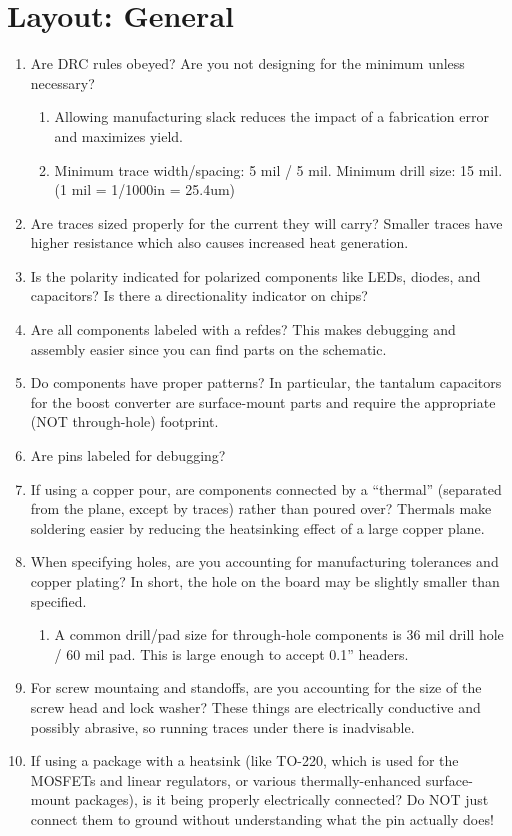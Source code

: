 \documentclass{article}
\begin{document}
\section{Layout: General}
\begin{enumerate}
  \item Are DRC rules obeyed? Are you not designing for the minimum unless necessary?
  \begin{enumerate}
    \item Allowing manufacturing slack reduces the impact of a fabrication error and maximizes yield.
    \item Minimum trace width/spacing: 5 mil / 5 mil. Minimum drill size: 15 mil. (1 mil = 1/1000in = 25.4um)
  \end{enumerate}
  \item Are traces sized properly for the current they will carry? Smaller traces have higher resistance which also causes increased heat generation.
  \item Is the polarity indicated for polarized components like LEDs, diodes, and capacitors? Is there a directionality indicator on chips?
  \item Are all components labeled with a refdes? This makes debugging and assembly easier since you can find parts on the schematic.
  \item Do components have proper patterns? In particular, the tantalum capacitors for the boost converter are surface-mount parts and require the appropriate (NOT through-hole) footprint.
  \item Are pins labeled for debugging?
  \item If using a copper pour, are components connected by a ``thermal'' (separated from the plane, except by traces) rather than poured over? Thermals make soldering easier by reducing the heatsinking effect of a large copper plane.
  \item When specifying holes, are you accounting for manufacturing tolerances and copper plating? In short, the hole on the board may be slightly smaller than specified.
  \begin{enumerate}
    \item A common drill/pad size for through-hole components is 36 mil drill hole / 60 mil pad. This is large enough to accept 0.1'' headers.
  \end{enumerate}
  \item For screw mountaing and standoffs, are you accounting for the size of the screw head and lock washer? These things are electrically conductive and possibly abrasive, so running traces under there is inadvisable.
  \item If using a package with a heatsink (like TO-220, which is used for the MOSFETs and linear regulators, or various thermally-enhanced surface-mount packages), is it being properly electrically connected? Do NOT just connect them to ground without understanding what the pin actually does!
\end{enumerate}
\end{document}
